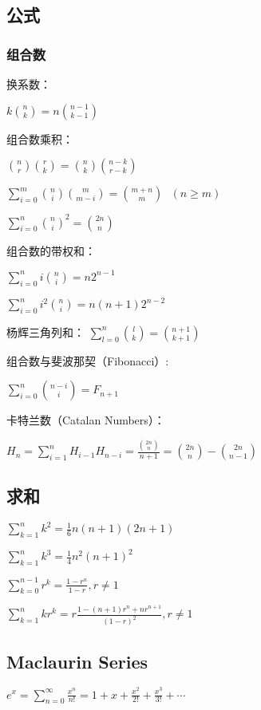 \documentclass[9pt,landscape]{article}
\begin{document}
\begin{multicols}{3}

\columnseprule=0.25pt

\section{公式}

\subsubsection{组合数}

换系数：

$k \binom{n}{k} = n \binom{n-1}{k-1}$

组合数乘积：

$\binom{n}{r}\binom{r}{k} = \binom{n}{k}\binom{n-k}{r-k}$

$\sum_{i=0}^m \binom{n}{i}\binom{m}{m-i} = \binom{m+n}{m}\ \ \ (n \geq m)$

$\sum_{i=0}^n\binom{n}{i}^2=\binom{2n}{n}$

组合数的带权和：

$ \sum_{i=0}^ni\binom{n}{i}=n2^{n-1}$

$ \sum_{i=0}^ni^2\binom{n}{i}=n(n+1)2^{n-2}$

杨辉三角列和：
$ \sum_{l=0}^n\binom{l}{k} = \binom{n+1}{k+1}$

组合数与斐波那契（Fibonacci）:

$ \sum_{i=0}^n\binom{n-i}{i}=F_{n+1}$

卡特兰数（Catalan Numbers）：

$H_n=\sum_{i=1}^nH_{i-1}H_{n-i}=\frac{\binom{2n}{n}}{n+1}=\binom{2n}{n}-\binom{2n}{n-1}$

\subsection{求和}

$\sum_{k=1}^{n}k^2=\frac{1}{6}n(n+1)(2n+1)$

$\sum_{k=1}^{n}k^3=\frac{1}{4}n^2(n+1)^2$

$\sum_{k=0}^{n-1}r^k=\frac{1-r^n}{1-r}, r\neq 1$

$\sum_{k=1}^{n}kr^k=r\frac{1-(n+1)r^n+nr^{n+1}}{(1-r)^2}, r\neq 1$

\subsection{Maclaurin Series}

$e^x = \sum_{n=0}^{\infty} \frac{x^n}{n!} = 1 + x + \frac{x^2}{2!} + \frac{x^3}{3!} + \cdots$


\end{multicols}
\end{document}
